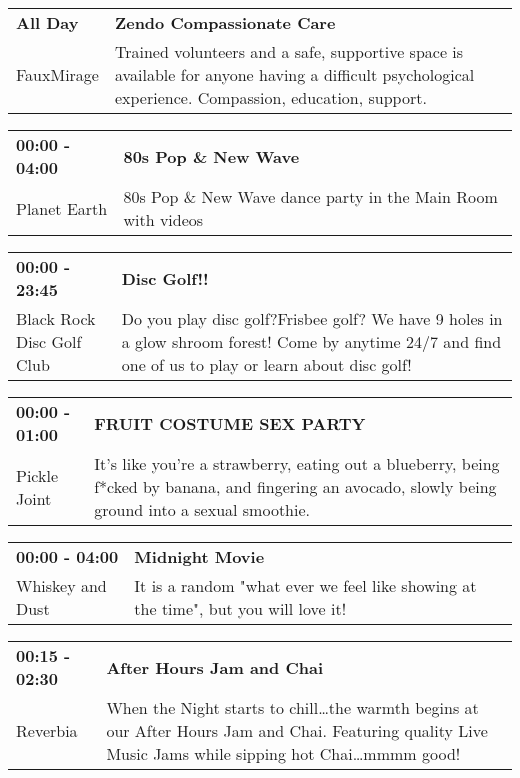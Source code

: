 \begin{tabular}{ p{1in} p{2.2in} }
    \textbf{All Day} & \textbf{Zendo Compassionate Care } \\
    FauxMirage \newline  & Trained volunteers and a safe, supportive space is available for anyone having a difficult psychological experience. Compassion, education, support. \\
    \hline 
\end{tabular}
    
\begin{tabular}{ p{1in} p{2.2in} }
    \textbf{00:00 - 04:00} & \textbf{80s Pop \& New Wave} \\
    Planet Earth \newline  & 80s Pop \& New Wave dance party in the Main Room with videos \\
    \hline 
\end{tabular}
    
\begin{tabular}{ p{1in} p{2.2in} }
    \textbf{00:00 - 23:45} & \textbf{Disc Golf!!} \\
    Black Rock Disc Golf Club \newline  & Do you play disc golf?Frisbee golf? We have 9 holes in a glow shroom forest! Come by anytime 24/7 and find one of us to play or learn about disc golf! \\
    \hline 
\end{tabular}
    
\begin{tabular}{ p{1in} p{2.2in} }
    \textbf{00:00 - 01:00} & \textbf{FRUIT COSTUME SEX PARTY} \\
    Pickle Joint \newline  & It's like you're a strawberry, eating out a blueberry, being f*cked by banana, and fingering an avocado, slowly being ground into a sexual smoothie. \\
    \hline 
\end{tabular}
    
\begin{tabular}{ p{1in} p{2.2in} }
    \textbf{00:00 - 04:00} & \textbf{Midnight Movie} \\
    Whiskey and Dust \newline  & It is a random "what ever we feel like showing at the time", but you will love it! \\
    \hline 
\end{tabular}
    
\begin{tabular}{ p{1in} p{2.2in} }
    \textbf{00:15 - 02:30} & \textbf{After Hours Jam and Chai} \\
    Reverbia \newline  & When the Night starts to chill\ldots the warmth begins at our After Hours Jam and Chai.  Featuring quality Live Music Jams while sipping hot Chai\ldots mmmm good! \\
    \hline 
\end{tabular}
    
